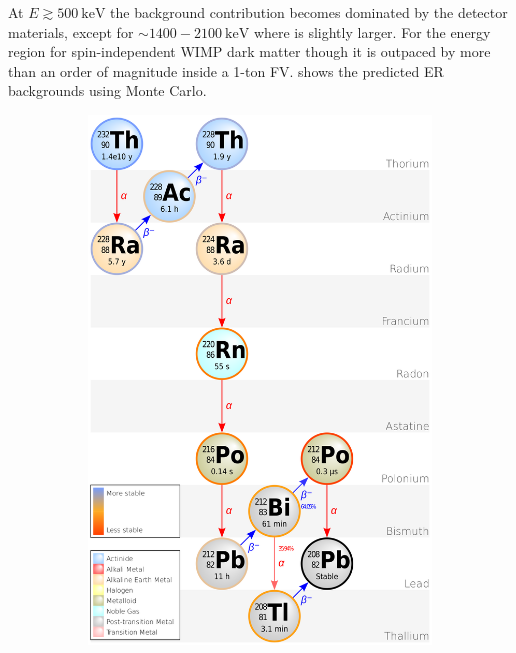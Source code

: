 {At $E \gtrsim 500\ \mathrm{keV}$ the background contribution becomes dominated by the detector materials, except for
${\sim} 1400-2100\ \mathrm{keV}$ where  is slightly larger.  For the energy region for spin-independent WIMP dark matter
though it is outpaced by more than an order of magnitude inside a 1-ton FV.   shows the predicted ER
backgrounds using Monte Carlo.

\begin{figure}
    \centering
    \begin{subfigure}[t]{0.5\textwidth}
        \centering
        \includegraphics[width=\textwidth]{Decay_Chain_of_Thorium-232}
    \end{subfigure}%
    \begin{subfigure}[t]{0.5\textwidth}

\end{subfigure}
\end{figure}}
